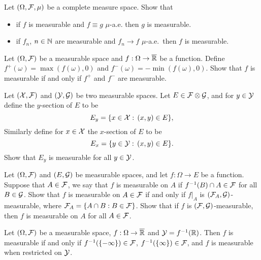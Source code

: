 \begin{problem} Let $(\Omega,\mathcal F,\mu)$ be a complete measure space. Show that 
\begin{itemize}
    \item if $f$ is measurable and $f\equiv g$ $\mu$-a.e. then $g$ is measurable.
    \item if $f_n$, $n\in \mathbb N$ are measurable and $f_n\to f$ $\mu$-a.e.\ then $f$ is measurable.
\end{itemize}
\end{problem}

\begin{problem}
    Let $(\Omega,\mathcal F)$ be a measurable space and $f:\Omega\to\overline{\mathbb R}$ be a function. 
    Define $f^+(\omega) = \max(f(\omega),0)$ and  $f^-(\omega) = -\min(f(\omega),0)$.
    Show that $f$ is measurable if and only if $f^+$ and $f^{-}$ are measurable.
\end{problem}

\begin{problem}   Let $(\mathcal X,\mathcal F)$ and $(\mathcal Y,\mathcal G)$ be two measurable spaces. Let $E\in \mathcal F\otimes \mathcal G$, and for $y\in \mathcal Y$ define the $y$-section of $E$ to be 
    \begin{equation*}
        E_y = \{x\in \mathcal X:\, (x,y)\in E\}, 
    \end{equation*}
    Similarly define for $x\in \mathcal X$ the $x$-section of $E$ to be 
    \begin{equation*}
        E_x = \{y\in \mathcal Y:\, (x,y)\in E\}.
    \end{equation*}
    Show that $E_y$ is measurable for all $y\in \mathcal Y$.
\end{problem}

\begin{problem} Let $(\Omega,\mathcal F)$ and $(E,\mathcal G)$ be measurable spaces, and let $f :\Omega \to E$
 be a function. Suppose that $A\in \mathcal F$, we say that $f$ is measurable on $A$ if 
 $f^{-1}(B)\cap A\in \mathcal F$ for all $B\in  \mathcal G$. Show that $f$ is measurable on $A\in \mathcal F$ if and only if $f|_A$ is $(\mathcal F_A,\mathcal G)$-measurable, where $\mathcal F_A = \{A\cap B: B\in \mathcal F\}$. 
 Show that if $f$ is $(\mathcal F,\mathcal G)$-measurable, then $f$ is measurable on $A$ for all $A\in \mathcal F$.
\end{problem}

\begin{problem} Let $(\Omega,\mathcal F)$ be a measurable space, $f :\Omega \to \overline{\mathbb R}$ and $\mathcal Y=f^{-1}(\mathbb R)$. Then $f$ is measurable if and only if $f^{-1} ( \{ -\infty\}) \in \mathcal F$, $f^{-1} ( \{ \infty\}) \in  \mathcal F$, and $f$ is measurable when restricted on $\mathcal Y$. 
\end{problem}

